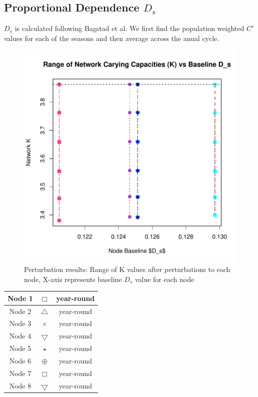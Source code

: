\documentclass[10pt]{article}
\begin{document}
\newpage
\subsection{Proportional Dependence \texorpdfstring{$D_s$}{DS}}

$D_s$ is calculated following Bagstad et al. We first find the population weighted $C^r$ values for each of the seasons and then average across the anual cycle.


\vspace{-.5cm}
\begin{figure}[H]
\begin{center}
\includegraphics[width=.8\textwidth, height=.8\textwidth]{RGraphics-plant_barcr_DS}
\caption{Perturbation results: Range of K values after perturbations to each node, X-axis represents baseline $D_s$ value for each node}\label{fig:plant_barcr_DS}
\end{center}
\end{figure}

\vspace{-.5cm}
\begin{tabular}{|c|c|c|}
\hline
{\color{red} Node 1} & $\Box$ & year-round \\
\hline
{\color{orange} Node 2} & $\triangle$ & year-round \\
\hline
{\color{yellow} Node 3} & $\times$ &  year-round \\
\hline
{\color{green} Node 4} & $\bigtriangledown$ & year-round \\
\hline
{\color{blue} Node 5} & $\star$ & year-round \\
\hline
{\color{purple} Node 6} & $\oplus$ & year-round \\
\hline
{\color{magenta} Node 7} & $\Box$ & year-round \\
\hline
{\color{cyan} Node 8} & $\bigtriangledown$ & year-round \\
\hline
\end{tabular}
\end{document}

